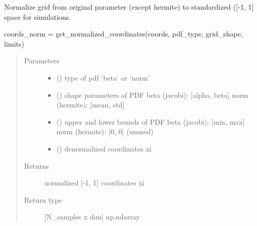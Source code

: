 \documentclass[letterpaper,10pt,english,openany,oneside]{sphinxmanual}
\begin{document}

\begin{fulllineitems}
\label{\detokenize{pygpc:pygpc.grid.get_normalized_coordinates}}
Normalize grid from original parameter (except hermite) to standardized ({[}-1, 1{]} space for simulations.

coords\_norm = get\_normalized\_coordinates(coords, pdf\_type, grid\_shape, limits)
\begin{quote}\begin{description}
\item[{Parameters}] \leavevmode\begin{itemize}
\item {} 
 (\sphinxstyleliteralemphasis{\sphinxupquote{{[}}}\sphinxstyleliteralemphasis{\sphinxupquote{{]} }}) \textendash{} type of pdf ‘beta’ or ‘norm’

\item {} 
 (\sphinxstyleliteralemphasis{\sphinxupquote{{[}}}\sphinxstyleliteralemphasis{\sphinxupquote{{]} }}) \textendash{} shape parameters of PDF
beta (jacobi):  {[}alpha, beta{]}
norm (hermite): {[}mean, std{]}

\item {} 
 (\sphinxstyleliteralemphasis{\sphinxupquote{{[}}}\sphinxstyleliteralemphasis{\sphinxupquote{{]} }}) \textendash{} upper and lower bounds of PDF
beta (jacobi):  {[}min, max{]}
norm (hermite): {[}0, 0{]} (unused)

\item {} 
 (\sphinxstyleliteralemphasis{\sphinxupquote{{[}}}\sphinxstyleliteralemphasis{\sphinxupquote{{]} }}) \textendash{} denormalized coordinates xi

\end{itemize}

\item[{Returns}] \leavevmode
{} \textendash{} normalized {[}-1, 1{]} coordinates xi

\item[{Return type}] \leavevmode
{[}N\_samples x dim{]} np.ndarray

\end{description}\end{quote}

\end{fulllineitems}
\end{document}
